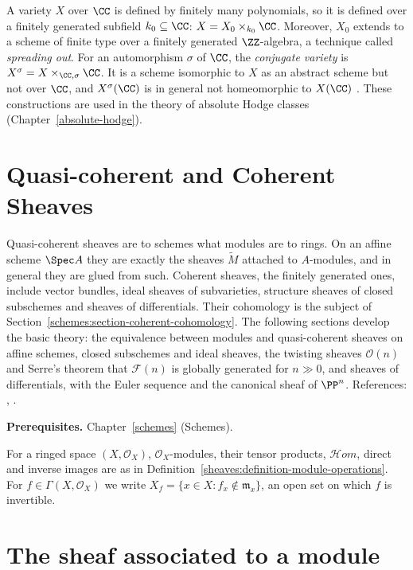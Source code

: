 \begin{remark}\label{schemes:remark-spreading-out}
A variety $X$ over $\CC$ is defined by finitely many polynomials, so it is defined over a finitely generated subfield $k_0 \subseteq \CC$: $X = X_0 \times_{k_0}\CC$.
Moreover, $X_0$ extends to a scheme of finite type over a finitely generated $\ZZ$-algebra, a technique called \emph{spreading out}. For an automorphism
$\sigma$ of $\CC$, the \emph{conjugate variety} is $X^\sigma = X \times_{\CC,\sigma}\CC$. It is a scheme isomorphic to $X$ as an abstract scheme but not
over $\CC$, and $X^\sigma(\CC)$ is in general not homeomorphic to $X(\CC)$ \cite{serre-1964}. These constructions are used in the theory of absolute Hodge
classes (Chapter~\ref{absolute-hodge}).
\end{remark}

\section{Quasi-coherent and Coherent Sheaves}\label{schemes:section-coherent-sheaves}
Quasi-coherent sheaves are to schemes what modules are to rings. On an affine scheme $\Spec A$ they are exactly the sheaves $\widetilde M$ attached
to $A$-modules, and in general they are glued from such. Coherent sheaves, the finitely generated ones, include vector bundles, ideal sheaves of
subvarieties, structure sheaves of closed subschemes and sheaves of differentials. Their cohomology is the subject of
Section~\ref{schemes:section-coherent-cohomology}. The following sections develop the basic theory: the equivalence between modules and quasi-coherent sheaves on affine
schemes, closed subschemes and ideal sheaves, the twisting sheaves $\mathcal{O}(n)$ and Serre's theorem that $\mathcal{F}(n)$ is globally generated
for $n \gg 0$, and sheaves of differentials, with the Euler sequence and the canonical sheaf of $\PP^n$. References:
\cite[Sections II.5 and II.8]{hartshorne-ag}, \cite{stacks-project}.

\noindent\textbf{Prerequisites.} Chapter~\ref{schemes} (Schemes).

For a ringed space $(X, \mathcal{O}_X)$, $\mathcal{O}_X$-modules, their tensor products, $\mathcal{H}om$, direct and inverse images are as in
Definition~\ref{sheaves:definition-module-operations}. For $f \in \Gamma(X, \mathcal{O}_X)$ we write $X_f = \{x \in X : f_x \notin \mathfrak{m}_x\}$, an open
set on which $f$ is invertible.

\section{The sheaf associated to a module}\label{schemes:section-tilde}

